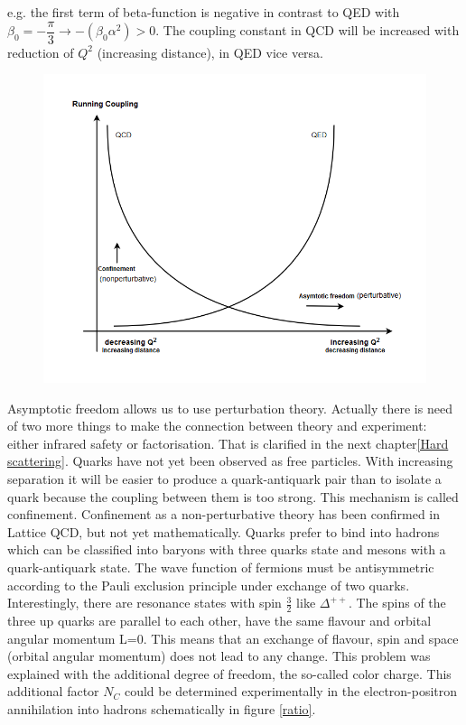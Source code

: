 e.g. the first term of beta-function is negative in contrast to QED with $ \beta_0=- \dfrac{\pi}{3} \rightarrow -(\beta_0 \alpha^2) >0 $. The coupling constant in QCD will be increased
with reduction of $ Q^2 $ (increasing distance), in QED vice versa.
\begin{figure}[h!]
\centering
\includegraphics[scale=0.7]{images/Intro/QCDRunningCoupling.png}
\end{figure}



Asymptotic freedom allows us to use perturbation theory. Actually there is need of two more things to make the connection between theory and experiment: either infrared safety or factorisation. That is clarified in the next chapter\ref{Hard scattering}.
Quarks have not yet been observed as free particles. With increasing separation it will be easier to produce a quark-antiquark pair than to isolate a quark because the coupling between them is too strong. This mechanism is called confinement. Confinement as a non-perturbative theory has been confirmed in Lattice QCD, but not yet mathematically.
Quarks prefer to bind into hadrons which can be classified into baryons with three quarks state and mesons with a quark-antiquark state.
The wave function of fermions must be antisymmetric according to the Pauli exclusion principle under exchange of two quarks. Interestingly, there are resonance states with spin $ \frac{3}{2} $ like $ {\Delta}^{++} $.
The spins of the three up quarks are parallel to each other, have the same flavour and orbital angular momentum L=0. This means that an exchange of flavour, spin and space (orbital angular momentum) does not lead to any change. This problem was explained with the additional degree of freedom, the so-called color charge. This additional factor $N_C$ could be determined experimentally in the electron-positron annihilation into hadrons schematically in figure \ref{ratio}. 

